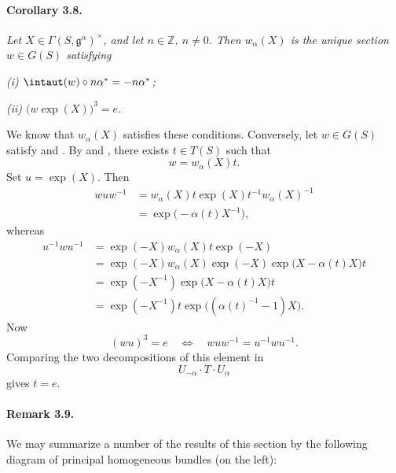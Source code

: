 \paragraph{\textbf{Corollary 3.8.}}
\emph{Let \(X\in\Gamma(S,\mathfrak g^\alpha)^\times\), and let
\(n\in\mathbb Z\), \(n\ne0\).  Then \(w_\alpha(X)\) is the unique
section \(w\in G(S)\) satisfying}

\smallskip
\noindent\emph{\textup{(i)}
\(\intaut(w)\circ n\alpha^\ast=-n\alpha^\ast\);}

\smallskip
\noindent\emph{\textup{(ii)}
\(\bigl(w\exp(X)\bigr)^3=e\).}

\smallskip
We know that \(w_\alpha(X)\) satisfies these conditions.  Conversely,
let \(w\in G(S)\) satisfy \textup{} and \textup{}.  By  and
 \textup{}, there exists \(t\in T(S)\) such that
\[
  w=w_\alpha(X)t.
\]
Set \(u=\exp(X)\).  Then
\[
\begin{aligned}
  wuw^{-1}
    &=w_\alpha(X)t\exp(X)t^{-1}w_\alpha(X)^{-1}\\
    &=\exp\bigl(-\alpha(t)X^{-1}\bigr),
\end{aligned}
\]
whereas
\[
\begin{aligned}
  u^{-1}wu^{-1}
    &={}\exp(-X)w_\alpha(X)t\exp(-X)\\
    &={}\exp(-X)w_\alpha(X)\exp(-X)
       \exp\bigl(X-\alpha(t)X\bigr)t\\
    &={}\exp(-X^{-1})\exp\bigl(X-\alpha(t)X\bigr)t\\
    &={}\exp(-X^{-1})t
       \exp\bigl((\alpha(t)^{-1}-1)X\bigr).
\end{aligned}
\]
Now
\[
  (wu)^3=e
  \quad\Longleftrightarrow\quad
  wuw^{-1}=u^{-1}wu^{-1}.
\]
Comparing the two decompositions of this element in
\[
  U_{-\alpha}\cdot T\cdot U_\alpha
\]
gives \(t=e\).


\paragraph{\textbf{Remark 3.9.}}
We may summarize a number of the results of this section by the
following diagram of principal homogeneous bundles (on the left):

